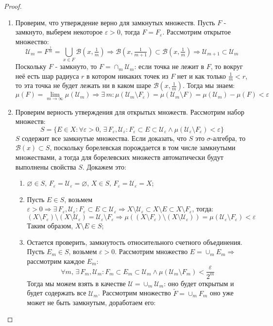 \documentclass[12pt]{article}
\newcommand{\MU}{\mathcal{U}}
\newcommand{\MB}{\mathcal{B}}
\newcommand{\VN}{\varnothing}
\newcommand{\VE}{\varepsilon}
\theoremstyle{definition}
\newcommand{\wte}[1]{\widetilde{#1}}
\begin{document}
\begin{proof}\hfill
	\begin{enumerate}[label=(\arabic*)]
		\item Проверим, что утверждение верно для замкнутых множеств. Пусть $F$ - замкнуто, выберем некоторое  $\VE > 0$, тогда $F = F_\VE$. Рассмотрим открытое множество:
		$$
			\MU_m = F^{\tfrac{1}{m}} = \bigcup\limits_{x \in F}\MB(x,\tfrac{1}{m}) \Rightarrow \MB(x,\tfrac{1}{m+1}) \subset \MB(x,\tfrac{1}{m}) \Rightarrow \MU_{m+1} \subset \MU_m
		$$
		Поскольку $F$ - замкнуто, то $F = \cap_m \MU_m$: если точка не лежит в $F$, то вокруг неё есть шар радиуса $r$ в котором никаких точек из $F$ нет и как только $\tfrac{1}{m} < r$, то эта точка не будет лежать ни в каком шаре $\MB(x,\tfrac{1}{m})$. Тогда мы знаем:
		$$
			\mu(F) = \lim\limits_{m \to \infty}\mu(\MU_m) \Rightarrow \exists \, m \colon \mu(\MU_m \setminus F_\VE) = \mu(\MU_m \setminus F) = \mu(\MU_m) - \mu(F) < \VE
		$$
		\item Проверим верность утверждения для открытых множеств. Рассмотрим набор множеств:
		$$
			S = \{E \in X \colon \forall \VE > 0, \, \exists \, F_\VE, \MU_\VE \colon F_\VE \subset E \subset \MU_\VE \wedge \mu(\MU_\VE \setminus  F_\VE) < \VE \}
		$$
		$S$ содержит все замкнутые множества. Если доказать, что $S$ это $\sigma$-алгебра, то $\MB(x) \subset S$, поскольку борелевская порождается в том числе замкнутыми множествами, а тогда для борелевских множеств автоматически будут выполнены свойства $S$. Докажем это:
		\begin{enumerate}[label=\arabic*)]
			\item $\VN \in S, \, F_\VE = \MU_\VE = \VN$, $X \in S, \, F_\VE = \MU_\VE = X$;
			\item Пусть $E \in S$, возьмем $\VE > 0 \Rightarrow \exists \, F_\VE, \MU_\VE \colon F_\VE \subset E \subset \MU_\VE \Rightarrow X \setminus \MU_\VE \subset X \setminus E \subset X \setminus F_\VE$, тогда:
			$$
				(X \setminus F_\VE) \setminus (X \setminus \MU_\VE) = \MU_\VE \setminus F_\VE \Rightarrow \mu((X \setminus F_\VE) \setminus (X \setminus \MU_\VE)) = \mu(\MU_\VE \setminus F_\VE) < \VE
			$$
			Таким образом, $X \setminus E \in S$;
			\item Остается проверить, замкнутость относительного счетного объединения. Пусть $E_m \in S$, возьмем $\VE > 0$. Рассмотрим множество $E = \cup_m E_m \Rightarrow$ рассмотрим каждое $E_m$:
			$$
				\forall m, \, \exists \, F_m, \MU_m \colon F_m \subset E_m \subset \MU_m \wedge \mu(\MU_m \setminus F_m) < \dfrac{\VE}{2^m}
			$$ 
			Тогда мы можем взять в качестве $\MU = \cup_m \MU_m$: оно будет открытым и будет содержать все  $\MU_m$. Рассмотрим множество $\wte{F} = \cup_m F_m$ оно уже может не быть замкнутым, доработаем его:

\end{enumerate}
\end{enumerate}
\end{proof}
\end{document}
